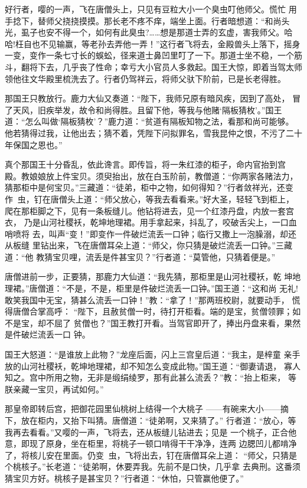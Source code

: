 好行者，嘤的一声，飞在唐僧头上，只见有豆粒大小一个臭虫叮他师父。慌忙
用手捻下，替师父挠挠摸摸。那长老不疼不痒，端坐上面。行者暗想道：“和尚头
光，虱子也安不得一个，如何有此臭虫?……想是那道士弄的玄虚，害我师父。哈
哈!枉自也不见输赢，等老孙去弄他一弄！”这行者飞将去，金殿兽头上落下，摇身
一变，变作一条七寸长的蜈蚣，径来道士鼻凹里叮了一下。那道士坐不稳，一个筋
斗，翻将下去，几乎丧了性命；幸亏大小官员人多救起。国王大惊，即着当驾太师
领他往文华殿里梳洗去了。行者仍驾祥云，将师父驮下阶前，已是长老得胜。

那国王只教放行。鹿力大仙又奏道：“陛下，我师兄原有暗风疾，因到了高处，
冒了天风，旧疾举发，故令和尚得胜。且留下他，等我与他赌‘隔板猜枚’。”国王
道：“怎么叫做‘隔板猜枚’？”鹿力道：“贫道有隔板知物之法，看那和尚可能够。
他若猜得过我，让他出去；猜不着，凭陛下问拟罪名，雪我昆仲之恨，不污了二十
年保国之恩也。”

真个那国王十分昏乱，依此谗言。即传旨，将一朱红漆的柜子，命内官抬到宫
殿。教娘娘放上件宝贝。须臾抬出，放在白玉阶前，教僧道：“你两家各赌法力，
猜那柜中是何宝贝。”三藏道：“徒弟，柜中之物，如何得知？”行者敛祥光，还变
作虫，钉在唐僧头上道：“师父放心，等我去看看来。”好大圣，轻轻飞到柜上，
爬在那柜脚之下，见有一条板缝儿。他钻将进去，见一个红漆丹盘，内放一套宫衣，
乃是山河社稷袄，乾坤地理裙。用手拿起来，抖乱了，咬破舌尖上，一口血哨喷将
去，叫声“变！”即变作一件破烂流丢一口钟；临行又撒上一泡臊溺，却还从板缝
里钻出来，飞在唐僧耳朵上道：“师父，你只猜是破烂流丢一口钟。”三藏道：“他
教猜宝贝哩，流丢是件甚宝贝？”行者道：“莫管他，只猜着便是。”

唐僧进前一步，正要猜，那鹿力大仙道：“我先猜，那柜里是山河社稷袄，乾
坤地理裙。”唐僧道：“不是，不是，柜里是件破烂流丢一口钟。”国王道：“这和尚
无礼!敢笑我国中无宝，猜甚么流丢一口钟！”教：“拿了！”那两班校尉，就要动手，
慌得唐僧合掌高呼：
“陛下，且赦贫僧一时，待打开柜看。端的是宝，贫僧领罪；如不是宝，却不屈了
贫僧也？”国王教打开看。当驾官即开了，捧出丹盘来看，果然是件破烂流丢一口
钟。

国王大怒道：“是谁放上此物？”龙座后面，闪上三宫皇后道：“我主，是梓童
亲手放的山河社稷袄，乾坤地理裙，却不知怎么变成此物。”国王道：“御妻请退，
寡人知之。宫中所用之物，无非是缎绢绫罗，那有此甚么流丢？”教：“抬上柜来，
等朕亲藏一宝贝，再试如何。”

那皇帝即转后宫，把御花园里仙桃树上结得一个大桃子
——有碗来大小——摘下，放在柜内，又抬下叫猜。唐僧道：“徒弟啊，又来猜了。”
行者道：“放心，等我再去看看。”又嘤的一声，飞将去，还从板缝儿钻进去；见是
一个桃子，正合他意，即现了原身，坐在柜里，将桃子一顿口啃得干干净净，连两
边腮凹儿都啃净了，将核儿安在里面。仍变虫，飞将出去，钉在唐僧耳朵上道：
“师父，只猜是个桃核子。”长老道：“徒弟啊，休要弄我。先前不是口快，几乎拿
去典刑。这番须猜宝贝方好。桃核子是甚宝贝？”行者道：“休怕，只管赢他便了。”

